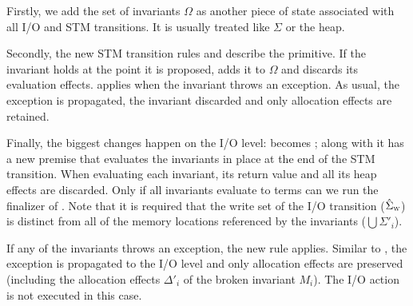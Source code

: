 Firstly, we add the set of invariants $\Omega$ as another piece of state associated with all I/O and STM transitions.
It is usually treated like $\Sigma$ or the heap.

Secondly, the new STM transition rules  and  describe the  primitive.
If the invariant holds at the point it is proposed,  adds it to $\Omega$ and discards its evaluation effects.
 applies when the invariant throws an exception.
As usual, the exception is propagated, the invariant discarded and only allocation effects are retained.

Finally, the biggest changes happen on the I/O level:
 becomes ;
along with  it has a new premise that evaluates the invariants in place at the end of the STM transition.
When evaluating each invariant, its return value and all its heap effects are discarded.
Only if all invariants evaluate to  terms can we run the finalizer of .
Note that it is required that the write set of the I/O transition ($\hat{\Sigma}_\textsc{w}$) is distinct from all of the memory locations referenced by the invariants ($\bigcup\Sigma'_i$).

If any of the invariants throws an exception, the new rule  applies.
Similar to , the exception is propagated to the I/O level and only allocation effects are preserved (including the allocation effects $\Delta'_i$ of the broken invariant $M_i$).
The I/O action is not executed in this case.
